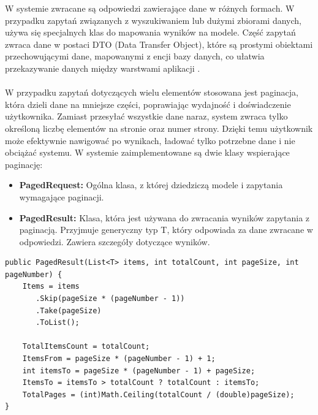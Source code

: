 \documentclass[twoside]{projektInzynierskiMS1}
\begin{document}
W systemie zwracane są odpowiedzi zawierające dane w różnych formach. W przypadku zapytań związanych z wyszukiwaniem lub dużymi zbiorami danych, używa się specjalnych klas do mapowania wyników na modele. Część zapytań zwraca dane w postaci DTO (Data Transfer Object), które są prostymi obiektami przechowującymi dane, mapowanymi z encji bazy danych, co ułatwia przekazywanie danych między warstwami aplikacji \cite{DataTransferObjects}.
\\\\
W przypadku zapytań dotyczących wielu elementów stosowana jest paginacja, która dzieli dane na mniejsze części, poprawiając wydajność i doświadczenie użytkownika. Zamiast przesyłać wszystkie dane naraz, system zwraca tylko określoną liczbę elementów na stronie oraz numer strony. Dzięki temu użytkownik może efektywnie nawigować po wynikach, ładować tylko potrzebne dane i nie obciążać systemu. W systemie zaimplementowane są dwie klasy wspierające paginację:

\begin{itemize}
    \item \textbf{PagedRequest:} Ogólna klasa, z której dziedziczą modele i zapytania wymagające paginacji.
    \item \textbf{PagedResult:} Klasa, która jest używana do zwracania wyników zapytania z paginacją. Przyjmuje generyczny typ T, który odpowiada za dane zwracane w odpowiedzi. Zawiera szczegóły dotyczące wyników.
\end{itemize}

\begin{lstlisting}[language=CSharp]
public PagedResult(List<T> items, int totalCount, int pageSize, int pageNumber) {
    Items = items
       .Skip(pageSize * (pageNumber - 1))
       .Take(pageSize)
       .ToList();

    TotalItemsCount = totalCount;
    ItemsFrom = pageSize * (pageNumber - 1) + 1;
    int itemsTo = pageSize * (pageNumber - 1) + pageSize;
    ItemsTo = itemsTo > totalCount ? totalCount : itemsTo;
    TotalPages = (int)Math.Ceiling(totalCount / (double)pageSize);
}
\end{lstlisting}

\newpage
\end{document}
